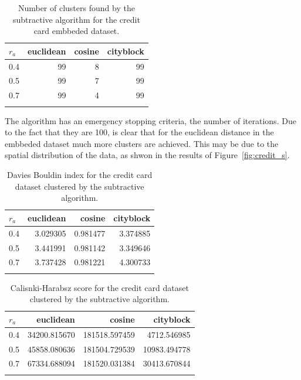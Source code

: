     \begin{table}[ht!]
        \centering
        \begin{tabular}{lrrr}
        \toprule
        $r_a$ &  euclidean &  cosine &  cityblock \\
        \midrule
        0.4 &         99 &       8 &         99 \\
        0.5 &         99 &       7 &         99 \\
        0.7 &         99 &       4 &         99 \\
        \bottomrule \\
        \end{tabular}
        \caption{Number of clusters found by the subtractive algorithm for the credit card embbeded dataset.}
        \label{tab:ce_n_s}
    \end{table}
    
    The algorithm has an emergency stopping criteria, the number of iterations. Due to the fact that they are 100, is clear that for the euclidean distance in the embbeded dataset much more clusters are achieved. This may be due to the spatial distribution of the data, as shwon in the results of Figure~\ref{fig:credit_s}.
    
    \begin{table}[ht!]
        \centering
        \begin{tabular}{lrrr}
        \toprule
        $r_a$ &  euclidean &    cosine &  cityblock \\
        \midrule
        0.4 &   3.029305 &  0.981477 &   3.374885 \\
        0.5 &   3.441991 &  0.981142 &   3.349646 \\
        0.7 &   3.737428 &  0.981221 &   4.300733 \\
        \bottomrule \\
        \end{tabular}
        \caption{Davies Bouldin index for the credit card dataset clustered by the subtractive algorithm.}
        \label{tab:c1_db_s}
    \end{table}
    
    \begin{table}[ht!]
        \centering
        \begin{tabular}{lrrr}
        \toprule
        $r_a$ &     euclidean &         cosine &     cityblock \\
        \midrule
        0.4 &  34200.815670 &  181518.597459 &   4712.546985 \\
        0.5 &  45858.080636 &  181504.729539 &  10983.494778 \\
        0.7 &  67334.688094 &  181520.031384 &  30413.670844 \\
        \bottomrule \\
        \end{tabular}
        \caption{Calisnki-Harabsz score for the credit card dataset clustered by the subtractive algorithm.}
        \label{tab:c1_ch_s}
    \end{table}
    
